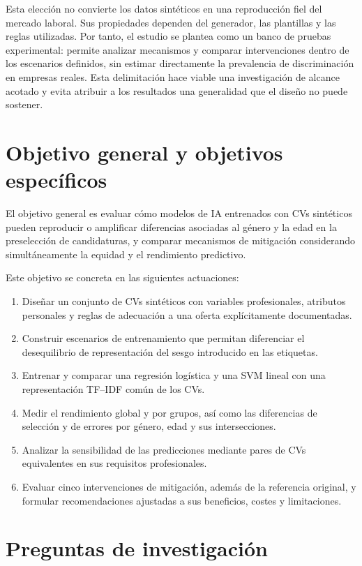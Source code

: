 \documentclass[11pt,a4paper,oneside]{report}
\begin{document}
Esta elección no convierte los datos sintéticos en una reproducción fiel del mercado laboral. Sus propiedades dependen del generador, las plantillas y las reglas utilizadas. Por tanto, el estudio se plantea como un banco de pruebas experimental: permite analizar mecanismos y comparar intervenciones dentro de los escenarios definidos, sin estimar directamente la prevalencia de discriminación en empresas reales. Esta delimitación hace viable una investigación de alcance acotado y evita atribuir a los resultados una generalidad que el diseño no puede sostener.

\section{Objetivo general y objetivos específicos}

El objetivo general es evaluar cómo modelos de IA entrenados con CVs sintéticos pueden reproducir o amplificar diferencias asociadas al género y la edad en la preselección de candidaturas, y comparar mecanismos de mitigación considerando simultáneamente la equidad y el rendimiento predictivo.

Este objetivo se concreta en las siguientes actuaciones:
\begin{enumerate}
\item Diseñar un conjunto de CVs sintéticos con variables profesionales, atributos personales y reglas de adecuación a una oferta explícitamente documentadas.
\item Construir escenarios de entrenamiento que permitan diferenciar el desequilibrio de representación del sesgo introducido en las etiquetas.
\item Entrenar y comparar una regresión logística y una SVM lineal con una representación TF--IDF común de los CVs.
\item Medir el rendimiento global y por grupos, así como las diferencias de selección y de errores por género, edad y sus intersecciones.
\item Analizar la sensibilidad de las predicciones mediante pares de CVs equivalentes en sus requisitos profesionales.
\item Evaluar cinco intervenciones de mitigación, además de la referencia original, y formular recomendaciones ajustadas a sus beneficios, costes y limitaciones.
\end{enumerate}

\section{Preguntas de investigación}
\end{document}
